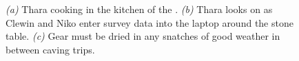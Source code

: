 \begin{figure}[t!]
\begin{subfigure}[t]{0.328\textwidth}
 \caption{}\label{thara bivi}
\end{subfigure}
    \hfill
    \begin{subfigure}[t]{0.662\textwidth}
        \centering
        \caption{} \label{clewin niko data}
    \end{subfigure}
    
    \vspace{0.3cm}
    \begin{subfigure}[t]{\textwidth}
    \centering
        \caption{} \label{drying gear}
    \end{subfigure}
    \caption{
    \textit{(a)} Thara cooking in the kitchen of the \protect{}. 
    \textit{(b)} Thara looks on as Clewin and Niko enter survey data into the laptop around the stone table. 
    \textit{(c)} Gear must be dried in any snatches of good weather in between caving trips. }
\end{figure}


